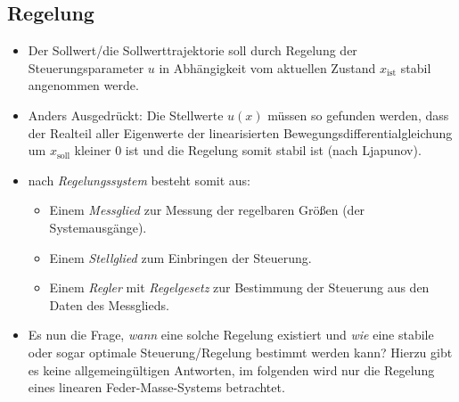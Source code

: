         \subsection{Regelung} %
            \begin{itemize}
            	\item Der Sollwert/die Sollwerttrajektorie soll durch Regelung der Steuerungsparameter \(u\) in Abhängigkeit vom aktuellen Zustand \(x_\text{ist}\) stabil angenommen werde.
            	\item Anders Ausgedrückt: Die Stellwerte \(u(x)\) müssen so gefunden werden, dass der Realteil aller Eigenwerte der linearisierten Bewegungsdifferentialgleichung um \(x_\text{soll}\) kleiner \(0\) ist und die Regelung somit stabil ist (nach Ljapunov).
            	\item nach \textit{Regelungssystem} besteht somit aus:
                	\begin{itemize}
                		\item Einem \textit{Messglied} zur Messung der regelbaren Größen (der Systemausgänge).
                		\item Einem \textit{Stellglied} zum Einbringen der Steuerung.
                		\item Einem \textit{Regler} mit \textit{Regelgesetz} zur Bestimmung der Steuerung aus den Daten des Messglieds.
                	\end{itemize}
            	\item Es nun die Frage, \textit{wann} eine solche Regelung existiert und \textit{wie} eine stabile oder sogar optimale Steuerung/Regelung bestimmt werden kann? Hierzu gibt es keine allgemeingültigen Antworten, im folgenden wird nur die Regelung eines linearen Feder-Masse-Systems betrachtet.
            \end{itemize}

